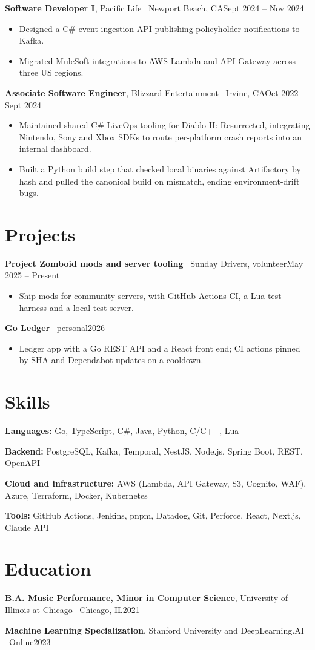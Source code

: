 \documentclass[10pt,letterpaper]{article}
\newcommand{\role}[4]{%
  \textbf{#1}, #2 \textcolor{muted}{\textperiodcentered\ #3}\hfill\textcolor{muted}{#4}\par}
\newcommand{\project}[3]{%
  \textbf{#1} \textcolor{muted}{\textperiodcentered\ #2}\hfill\textcolor{muted}{#3}\par}
\newcommand{\skills}[2]{\textbf{#1:} #2\par}
\newcommand{\gap}{\vspace{3pt}}
\begin{document}
\gap
\role{Software Developer I}{Pacific Life}{Newport Beach, CA}{Sept 2024 -- Nov 2024}
\begin{itemize}
  \item Designed a C\# event-ingestion API publishing policyholder notifications to Kafka.
  \item Migrated MuleSoft integrations to AWS Lambda and API Gateway across three US regions.
\end{itemize}
\gap
\role{Associate Software Engineer}{Blizzard Entertainment}{Irvine, CA}{Oct 2022 -- Sept 2024}
\begin{itemize}
  \item Maintained shared C\# LiveOps tooling for Diablo II: Resurrected, integrating Nintendo, Sony and
        Xbox SDKs to route per-platform crash reports into an internal dashboard.
  \item Built a Python build step that checked local binaries against Artifactory by hash and pulled
        the canonical build on mismatch, ending environment-drift bugs.
\end{itemize}

\section{Projects}
\project{Project Zomboid mods and server tooling}{Sunday Drivers, volunteer}{May 2025 -- Present}
\begin{itemize}
  \item Ship mods for community servers, with GitHub Actions CI, a Lua test harness and a local test server.
\end{itemize}
\gap
\project{Go Ledger}{personal}{2026}
\begin{itemize}
  \item Ledger app with a Go REST API and a React front end; CI actions pinned by SHA and Dependabot
        updates on a cooldown.
\end{itemize}

\section{Skills}
\skills{Languages}{Go, TypeScript, C\#, Java, Python, C/C++, Lua}
\skills{Backend}{PostgreSQL, Kafka, Temporal, NestJS, Node.js, Spring Boot, REST, OpenAPI}
\skills{Cloud and infrastructure}{AWS (Lambda, API Gateway, S3, Cognito, WAF), Azure, Terraform, Docker,
  Kubernetes}
\skills{Tools}{GitHub Actions, Jenkins, pnpm, Datadog, Git, Perforce, React, Next.js, Claude API}

\section{Education}
\role{B.A. Music Performance, Minor in Computer Science}{University of Illinois at Chicago}{Chicago, IL}{2021}
\role{Machine Learning Specialization}{Stanford University and DeepLearning.AI}{Online}{2023}
\end{document}
